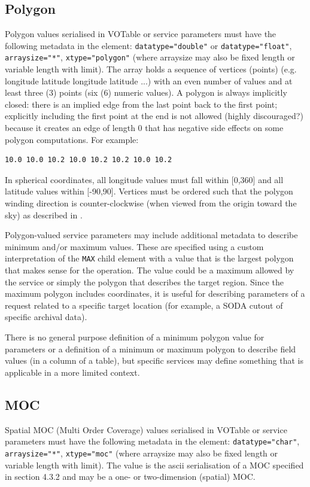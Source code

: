 \documentclass[11pt,letter]{ivoa}
\begin{document}
\subsection{Polygon}
Polygon values serialised in VOTable or service parameters must have the following metadata in the
 element: \verb|datatype="double"| or \verb|datatype="float"|,  \verb|arraysize="*"|, \verb|xtype="polygon"|
(where arraysize may also be fixed length or variable length with limit).
The array holds a sequence of vertices (points) (e.g. longitude latitude longitude
latitude ...) with an even number of values and at least three (3) points (six
(6) numeric values). A polygon is always implicitly closed: there is an implied edge from
the last point back to the first point; explicitly including the first point at the end is
not allowed (highly discouraged?) because it creates an edge of length 0 that has
negative side effects on some polygon computations. For example:

\begin{verbatim}
10.0 10.0 10.2 10.0 10.2 10.2 10.0 10.2
\end{verbatim}

In spherical coordinates, all longitude values must fall within [0,360] and all
latitude values within [-90,90]. Vertices must be ordered such that the polygon
winding direction is counter-clockwise (when viewed from the origin toward the
sky) as described in \citep{2007ivoa.spec.1030R}.

Polygon-valued service parameters may include additional metadata to describe minimum
and/or maximum values. These are specified using a custom interpretation of the
\verb|MAX| child element with a value that is the largest polygon that makes sense
for the operation. The value could be a maximum allowed by the service or simply
the polygon that describes the target region. Since the maximum polygon includes
coordinates, it is useful for describing parameters of a request related
to a specific target location (for example, a SODA cutout of specific archival data).

There is no general purpose definition of a minimum polygon value for parameters or
a definition of a minimum or maximum polygon to describe field values (in a column
of a table), but specific services may define something that is applicable in a
more limited context.

\subsection{MOC}
Spatial MOC (Multi Order Coverage) values serialised in VOTable or service parameters must
have the following metadata in the  element:
\verb|datatype="char"|, \verb|arraysize="*"|, \verb|xtype="moc"|
(where arraysize may also be fixed length or variable length with limit).
The value is the ascii serialisation of a MOC specified in \citet{2022ivoa.spec.0727F}
section 4.3.2 and may be a one- or two-dimension (spatial) MOC.
\end{document}
